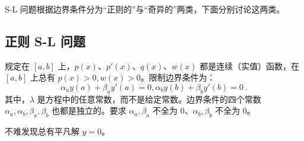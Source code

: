 S-L 问题根据边界条件分为“正则的”与“奇异的”两类，下面分别讨论这两类。
\subsection{正则 S-L 问题}
规定在 $[a, b]$ 上，$p(x)$、$p'(x)$、$q(x)$、$w(x)$ 都是连续（实值）函数，在 $[a, b]$ 上总有 $p(x) > 0, w(x)> 0$。限制边界条件为：
\begin{equation}\label{eq_SLthrm_2}
\alpha_ay(a) + \beta_a y'(a) = 0, 
\alpha_b y(b) + \beta_b y'(b) = 0 ~.
\end{equation}
其中，$\lambda$ 是方程中的任意常数，而不是给定常数。边界条件的四个常数 $\alpha_a, \alpha_b, \beta_a, \beta_b$ 也都是独立的。要求 $\alpha_a, \beta_a$ 不全为 $0$、$\alpha_b, \beta_b$ 不全为 $0$。

不难发现总有平凡解 $y=0$。

